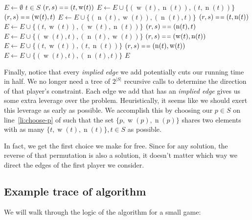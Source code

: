 \documentclass[12pt,x11names, rgb]{article}
\DeclareMathOperator{\w}{w}
\DeclareMathOperator{\n}{n}
\begin{document}
    \begin{codebox}
    \Procname{$\proc{ImpliedEdges}((r,s),S,\n,\w)$}
    \li $E \gets \emptyset$
    \li \For $t \in S$
    \li     \Do
            \If $(r,s) \isequal (t, \w(t))$
    \li         \Do
                $E \gets E \cup \{(\w(t),\n(t)), (t, \n(t))\}$
    \li     \ElseIf $(r,s) \isequal (\w(t), t)$
    \li         \Do
                $E \gets E \cup \{(\n(t),\w(t)), (\n(t), t)\}$ 
    \li     \ElseIf $(r,s) \isequal (t, \n(t))$
    \li         \Do
                $E \gets E \cup \{(t,\w(t)), (\w(t), \n(t))\}$
    \li     \ElseIf $(r,s) \isequal (\n(t), t)$
    \li         \Do
                $E \gets E \cup \{(\w(t), t), (\n(t), \w(t))\}$
    \li     \ElseIf $(r,s) \isequal (\w(t), \n(t))$
    \li         \Do
                $E \gets E \cup \{(t,\w(t)), (t, \n(t))\}$
    \li     \ElseIf $(r,s) \isequal (\n(t), \w(t))$
    \li         \Do
                $E \gets E \cup \{(\w(t), t), (\n(t), t)\}$
            \End
        \End
    \li \Return $E$
    \end{codebox}

    Finally, notice that every \emph{implied edge} we add potentially cuts our running time in half. We no longer need a tree of $2^{\lvert S \rvert}$ recursive calls to determine the direction of that player's constraint. Each edge we add that has an \emph{implied edge} gives us some extra leverage over the problem. Heuristically, it seems like we should exert this leverage as early as possible. We accomplish this by choosing our $p\in S$ on line~\ref{li:choose-p} of  such that the set $\{p,\w(p), \n(p)\}$ shares two elements with as many $\{t, \w(t), \n(t)\}, t\in S$ as possible. 

    In fact, we get the first choice we make for free. Since for any solution, the reverse of that permutation is also a solution, it doesn't matter which way we direct the edges of the first player we consider.

\subsection{Example trace of algorithm}
\label{sec:alg-example}
    We will walk through the logic of the algorithm for a small game:
\end{document}

